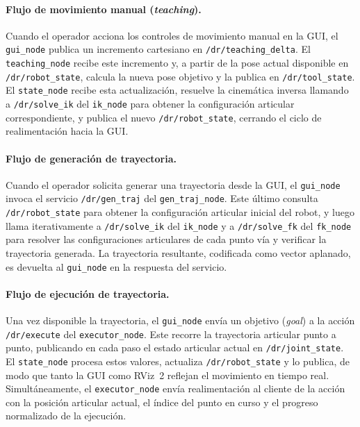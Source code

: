 \documentclass{article}
\begin{document}
\paragraph{Flujo de movimiento manual (\textit{teaching}).}
Cuando el operador acciona los controles de movimiento manual en la GUI, el \texttt{gui\_node} publica un incremento cartesiano en \texttt{/dr/teaching\_delta}. El \texttt{teaching\_node} recibe este incremento y, a partir de la pose actual disponible en \texttt{/dr/robot\_state}, calcula la nueva pose objetivo y la publica en \texttt{/dr/tool\_state}. El \texttt{state\_node} recibe esta actualización, resuelve la cinemática inversa llamando a \texttt{/dr/solve\_ik} del \texttt{ik\_node} para obtener la configuración articular correspondiente, y publica el nuevo \texttt{/dr/robot\_state}, cerrando el ciclo de realimentación hacia la GUI.

\paragraph{Flujo de generación de trayectoria.}
Cuando el operador solicita generar una trayectoria desde la GUI, el \texttt{gui\_node} invoca el servicio \texttt{/dr/gen\_traj} del \texttt{gen\_traj\_node}. Este último consulta \texttt{/dr/robot\_state} para obtener la configuración articular inicial del robot, y luego llama iterativamente a \texttt{/dr/solve\_ik} del \texttt{ik\_node} y a \texttt{/dr/solve\_fk} del \texttt{fk\_node} para resolver las configuraciones articulares de cada punto vía y verificar la trayectoria generada. La trayectoria resultante, codificada como vector aplanado, es devuelta al \texttt{gui\_node} en la respuesta del servicio.

\paragraph{Flujo de ejecución de trayectoria.}
Una vez disponible la trayectoria, el \texttt{gui\_node} envía un objetivo (\textit{goal}) a la acción \texttt{/dr/execute} del \texttt{executor\_node}. Este recorre la trayectoria articular punto a punto, publicando en cada paso el estado articular actual en \texttt{/dr/joint\_state}. El \texttt{state\_node} procesa estos valores, actualiza \texttt{/dr/robot\_state} y lo publica, de modo que tanto la GUI como RViz~2 reflejan el movimiento en tiempo real. Simultáneamente, el \texttt{executor\_node} envía realimentación al cliente de la acción con la posición articular actual, el índice del punto en curso y el progreso normalizado de la ejecución.
\end{document}
